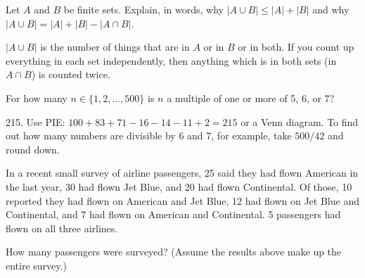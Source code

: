 \begin{questions}
\begin{answer}
	\end{answer}
	
	
	
\question Let $A$ and $B$ be finite sets.  Explain, in words, why $|A \cup B| \le |A| + |B|$ and why $|A \cup B| = |A| + |B| - |A \cap B|$.

	\begin{answer}
		$|A \cup B|$ is the number of things that are in $A$ or in $B$ or in both.  If you count up everything in each set independently, then anything which is in both sets (in $A \cap B$) is counted twice.
	\end{answer}
	
	
	
\question For how many $n \in \{1,2, \ldots, 500\}$ is $n$ a multiple of one or more of 5, 6, or 7?

	\begin{answer}
		215.  Use PIE: $100 + 83 + 71 - 16 - 14 -11 + 2 = 215$ or a Venn diagram.  To find out how many numbers are divisible by 6 and 7, for example, take $500/42$ and round down.
	\end{answer}
	
	


\question In a recent small survey of airline passengers, 25 said they had flown American in the last year, 30 had flown Jet Blue, and 20 had flown Continental.  Of those, 10 reported they had flown on American and Jet Blue, 12 had flown on Jet Blue and Continental, and 7 had flown on American and Continental.  5 passengers had flown on all three airlines. 

How many passengers were surveyed?  (Assume the results above make up the entire survey.)


\end{questions}
